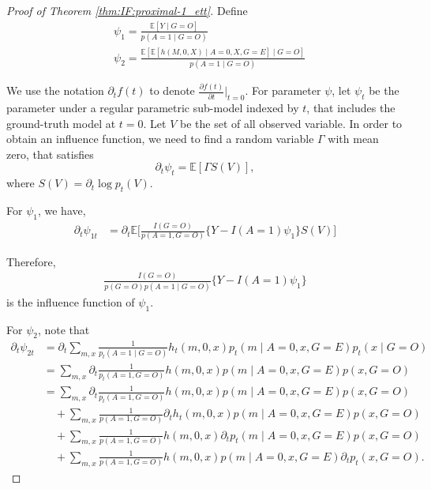 \documentclass[10pt]{article}
\newcommand{\E}{\mathbb{E}}
\begin{document}
\begin{proof}[Proof of Theorem \ref{thm:IF:proximal-1_ett}]
    Define
    \begin{align*}
        &\psi_1=\frac{\mathbb{E}[Y\mid G=O]}{p(A=1\mid G=O)}\\
        &\psi_2=\frac{\mathbb{E}[\mathbb{E}[h(M,0,X)\mid A=0,X,G=E]\mid G=O]}{p(A=1\mid G=O)}
    \end{align*}

    We use the notation $\partial_tf(t)$ to denote $\frac{\partial f(t)}{\partial t}\big|_{t=0}$.
For parameter $\psi$, let $\psi_t$ be the parameter under a regular parametric sub-model indexed by $t$, that includes the ground-truth model at $t=0$. Let $V$ be the set of all observed variable.
In order to obtain an influence function, we need to find a random variable $\Gamma$ with mean zero, that satisfies
\[
\partial_t\psi_t=\E[\Gamma S(V)],
\]
where $S(V)=\partial_t\log p_t(V)$.

For $\psi_1$, we have,
\begin{align*}
    \partial_t\psi_{1t}&=\partial_t\mathbb{E}\Big[\frac{I(G=O)}{p(A=1,G=O)}\{Y-I(A=1)\psi_1\}S(V)\Big]
\end{align*}

Therefore,
\begin{align}\label{eq:IF:proxy-ett1}
    \frac{I(G=O)}{p(G=O)p(A=1\mid G=O)}\{Y-I(A=1)\psi_1\}
\end{align}
is the influence function of $\psi_1$.

For $\psi_2$, note that
\begin{equation}
\label{eq:IF:proxy-ett2}
\begin{aligned}
    \partial_t\psi_{2t}&=\partial_t \sum_{m,x} \frac{1}{p_t(A=1\mid G=O)}h_t(m,0,x)p_t(m\mid A=0,x,G=E)p_t(x\mid G=O)\\
&= \sum_{m,x} \partial_t\frac{1}{p_t(A=1,G=O)}h(m,0,x)p(m\mid A=0,x,G=E)p(x, G=O)\\
&= \sum_{m,x} \partial_t\frac{1}{p_t(A=1,G=O)}h(m,0,x)p(m\mid A=0,x,G=E)p(x, G=O)\\
&\quad+\sum_{m,x} \frac{1}{p(A=1, G=O)}\partial_t h_t(m,0,x)p(m\mid A=0,x,G=E)p(x, G=O) \\
&\quad+ \sum_{m,x} \frac{1}{p(A=1, G=O)}h(m,0,x)\partial_t p_t(m\mid A=0,x,G=E)p(x, G=O)\\
&\quad+ \sum_{m,x} \frac{1}{p(A=1, G=O)}h(m,0,x)p(m\mid A=0,x,G=E)\partial_t p_t(x, G=O).
\end{aligned}
\end{equation}


\end{proof}
\end{document}
